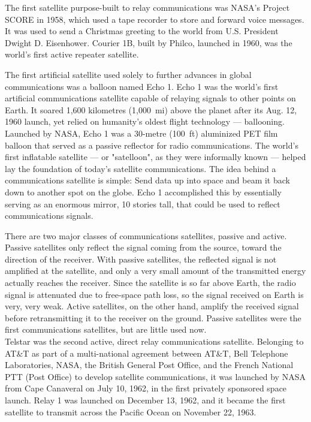 The first satellite purpose-built to relay communications was NASA's
Project SCORE in 1958, which used a tape recorder to store and forward
voice messages. It was used to send a Christmas greeting to the world
from U.S. President Dwight D. Eisenhower. Courier 1B, built by Philco,
launched in 1960, was the world's first active repeater satellite.

The first artificial satellite used solely to further advances in global
communications was a balloon named Echo 1. Echo 1 was the world's first
artificial communications satellite capable of relaying signals to other
points on Earth. It soared 1,600 kilometres (1,000~mi) above the planet
after its Aug. 12, 1960 launch, yet relied on humanity's oldest flight
technology --- ballooning. Launched by NASA, Echo 1 was a 30-metre
(100~ft) aluminized PET film balloon that served as a passive reflector
for radio communications. The world's first inflatable satellite --- or
"satelloon", as they were informally known --- helped lay the foundation
of today's satellite communications. The idea behind a communications
satellite is simple: Send data up into space and beam it back down to
another spot on the globe. Echo 1 accomplished this by essentially
serving as an enormous mirror, 10 stories tall, that could be used to
reflect communications signals.

There are two major classes of communications satellites, passive and
active. Passive satellites only reflect the signal coming from the
source, toward the direction of the receiver. With passive satellites,
the reflected signal is not amplified at the satellite, and only a very
small amount of the transmitted energy actually reaches the receiver.
Since the satellite is so far above Earth, the radio signal is
attenuated due to free-space path loss, so the signal received on Earth
is very, very weak. Active satellites, on the other hand, amplify the
received signal before retransmitting it to the receiver on the ground.
Passive satellites were the first communications satellites, but are
little used now.\\
Telstar was the second active, direct relay communications satellite.
Belonging to AT\&T as part of a multi-national agreement between AT\&T,
Bell Telephone Laboratories, NASA, the British General Post Office, and
the French National PTT (Post Office) to develop satellite
communications, it was launched by NASA from Cape Canaveral on July 10,
1962, in the first privately sponsored space launch. Relay 1 was
launched on December 13, 1962, and it became the first satellite to
transmit across the Pacific Ocean on November 22, 1963.

